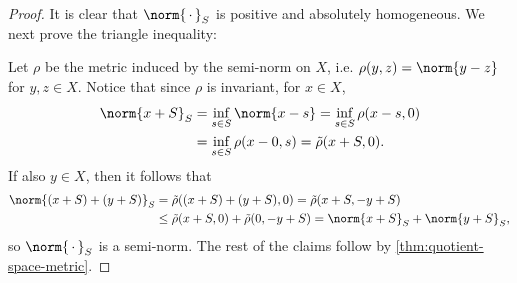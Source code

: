 \documentclass[article, a4paper, 11pt, oneside]{memoir}
\numberwithin{equation}{chapter}
\begin{document}
\begin{proof}
    It is clear that $\norm{\,\cdot\,}_S$ is positive and absolutely homogeneous. We next prove the triangle inequality:
    
    Let $\rho$ be the metric induced by the semi-norm on $X$, i.e. $\rho(y,z) = \norm{y - z}$ for $y,z \in X$. Notice that since $\rho$ is invariant, for $x \in X$,
    \begin{align*}
        \norm{x + S}_S
            &= \inf_{s \in S} \norm{x - s}
             = \inf_{s \in S} \rho(x - s, 0) \\
            &= \inf_{s \in S} \rho(x - 0, s)
             = \tilde{\rho}(x + S, 0).
    \end{align*}
    If also $y \in X$, then it follows that
    \begin{align*}
        \norm{(x + S) + (y + S)}_S
            &= \tilde{\rho}((x + S) + (y + S), 0)
             = \tilde{\rho}(x + S, -y + S) \\
            &\leq \tilde{\rho}(x + S, 0) + \tilde{\rho}(0, -y + S)
             = \norm{x + S}_S + \norm{y + S}_S,
    \end{align*}
    so $\norm{\,\cdot\,}_S$ is a semi-norm. The rest of the claims follow by \cref{thm:quotient-space-metric}.
\end{proof}


\nocite{*}

\printbibliography
\end{document}
